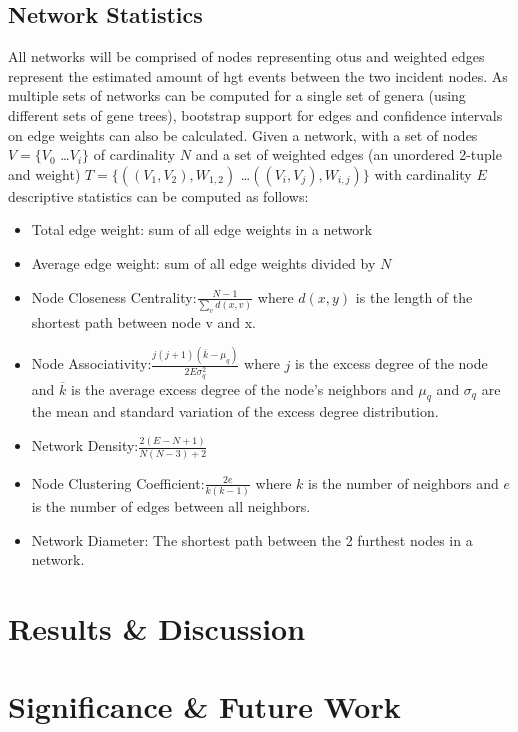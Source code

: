 \documentclass[12pt,letter]{article}
\begin{document}
\subsection*{Network Statistics}
All networks will be comprised of nodes representing \ac{otu}s and weighted edges represent the estimated amount of \ac{hgt} events between the two incident nodes.
As multiple sets of networks can be computed for a single set of genera (using different sets of gene trees), bootstrap support for edges and confidence intervals on edge weights can also be calculated.
Given a network, with a set of nodes $V = \{V_0$ \dots $V_i\}$ of cardinality $N$ and a set of weighted edges (an unordered 2-tuple and weight) $T = \{((V_1,V_2),W_{1,2})$ \dots $((V_i,V_j),W_{i,j})\}$ with cardinality $E$ descriptive statistics can be computed as follows\citep{netstat}:
\begin{itemize}
    \item Total edge weight: sum of all edge weights in a network
    \item Average edge weight: sum of all edge weights divided by $N$
    \item Node Closeness Centrality:$ \frac{N-1}{\sum_v d(x,v)}$ where $d(x,y)$ is the length of the shortest path between node v and x.
    \item Node Associativity:$ \frac{j(j+1)(\overline{k}-\mu_q)}{2E\sigma^2_q}$ where $j$ is the excess degree of the node and $\overline{k}$ is the average excess degree of the node's neighbors and $\mu_q$ and $\sigma_q$ are the mean and standard variation of the excess degree distribution.
    \item Network Density:$ \frac{2(E-N+1)}{N(N-3)+2}$
    \item Node Clustering Coefficient:$ \frac{2e}{k(k-1)}$ where $k$ is the number of neighbors and $e$ is the number of edges between all neighbors.
    \item Network Diameter: The shortest path between the 2 furthest nodes in a network.
\end{itemize}
\printbibliography
\section*{\huge Results \& Discussion}
\section*{\huge Significance \& Future Work}
\end{document}
